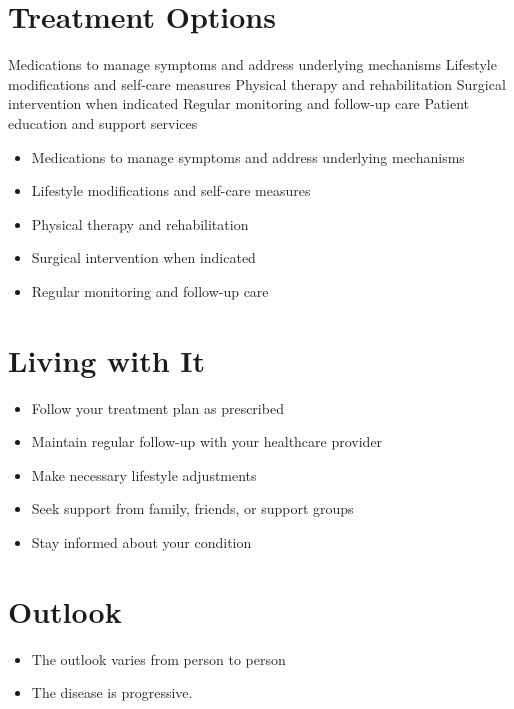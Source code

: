 \section{Treatment Options}
Medications to manage symptoms and address underlying mechanisms Lifestyle modifications and self-care measures Physical therapy and rehabilitation Surgical intervention when indicated Regular monitoring and follow-up care Patient education and support services

\begin{itemize}[noitemsep]
  \item Medications to manage symptoms and address underlying mechanisms
  \item Lifestyle modifications and self-care measures
  \item Physical therapy and rehabilitation
  \item Surgical intervention when indicated
  \item Regular monitoring and follow-up care
\end{itemize}
\section{Living with It}
\begin{itemize}[noitemsep]
  \item Follow your treatment plan as prescribed
  \item Maintain regular follow-up with your healthcare provider
  \item Make necessary lifestyle adjustments
  \item Seek support from family, friends, or support groups
  \item Stay informed about your condition
\end{itemize}
\section{Outlook}
\begin{itemize}[noitemsep]
  \item The outlook varies from person to person
  \item The disease is progressive.
\end{itemize}
